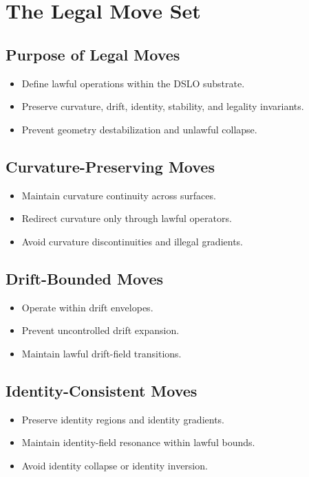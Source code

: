 \section{The Legal Move Set}

\subsection{Purpose of Legal Moves}
\begin{itemize}
    \item Define lawful operations within the DSLO substrate.
    \item Preserve curvature, drift, identity, stability, and legality invariants.
    \item Prevent geometry destabilization and unlawful collapse.
\end{itemize}

\subsection{Curvature-Preserving Moves}
\begin{itemize}
    \item Maintain curvature continuity across surfaces.
    \item Redirect curvature only through lawful operators.
    \item Avoid curvature discontinuities and illegal gradients.
\end{itemize}

\subsection{Drift-Bounded Moves}
\begin{itemize}
    \item Operate within drift envelopes.
    \item Prevent uncontrolled drift expansion.
    \item Maintain lawful drift-field transitions.
\end{itemize}

\subsection{Identity-Consistent Moves}
\begin{itemize}
    \item Preserve identity regions and identity gradients.
    \item Maintain identity-field resonance within lawful bounds.
    \item Avoid identity collapse or identity inversion.
\end{itemize}

